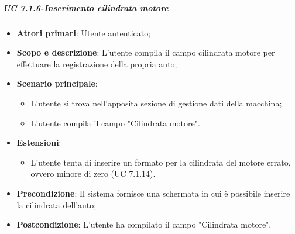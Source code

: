                  \subparagraph{UC 7.1.6-Inserimento cilindrata motore}
    \begin{itemize}
                \item \textbf{Attori primari}: Utente autenticato;
               
                 \item \textbf{Scopo e descrizione}: L'utente compila il campo cilindrata motore per effettuare la registrazione della propria auto;
                 \item \textbf{Scenario principale}: 
                 \begin{itemize}
                     \item L'utente si trova nell'apposita sezione di gestione dati della macchina;
                     \item L'utente compila il campo "Cilindrata motore".
                 \end{itemize}
                 \item \textbf{Estensioni}:
                 \begin{itemize}
                        \item L'utente tenta di inserire un formato per la cilindrata del motore errato, ovvero minore di zero (UC 7.1.14).
                    \end{itemize}
                 \item \textbf{Precondizione}: Il sistema fornisce una schermata in cui è possibile inserire la cilindrata dell'auto;
                 \item \textbf{Postcondizione}: L'utente ha compilato il campo "Cilindrata motore".
                 \end{itemize}
                 
